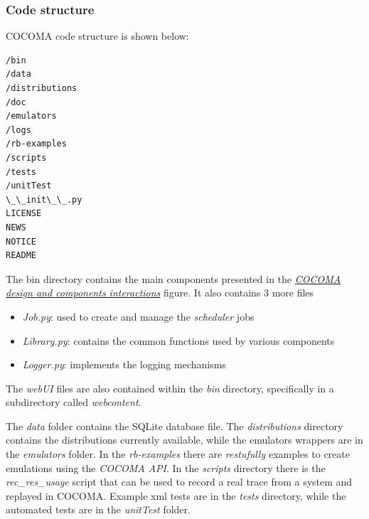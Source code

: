 \documentclass[letterpaper,10pt,english]{sphinxhowto}
\begin{document}
\subsubsection{Code structure}
\label{COCOMA/10_implementation_details:code-structure}
COCOMA code structure is shown below:

\begin{Verbatim}[commandchars=\\\{\}]
/bin
/data
/distributions
/doc
/emulators
/logs
/rb-examples
/scripts
/tests
/unitTest
\_\_init\_\_.py
LICENSE
NEWS
NOTICE
README
\end{Verbatim}

The bin directory contains the main components presented in the {\hyperref[COCOMA/10_implementation_details:cocoma-design]{\emph{COCOMA design and components interactions}}} figure. It also contains 3 more files
\begin{itemize}
\item {} 
\emph{Job.py}: used to create and manage the \emph{scheduler} jobs

\item {} 
\emph{Library.py}: contains the common functions used by various components

\item {} 
\emph{Logger.py}: implements the logging mechanisms

\end{itemize}

The \emph{webUI} files are also contained within the \emph{bin} directory, specifically in a subdirectory called \emph{webcontent}.

The \emph{data} folder contains the SQLite database file. The \emph{distributions} directory contains the distributions currently available, while the emulators wrappers are in the \emph{emulators} folder. In the \emph{rb-examples} there are \emph{restufully} examples to create emulations using the \emph{COCOMA API}. In the \emph{scripts} directory there is the \emph{rec\_res\_usage} script that can be used to record a real trace from a system and replayed in COCOMA. Example xml tests are in the \emph{tests} directory, while the automated tests are in the \emph{unitTest} folder.
\end{document}
